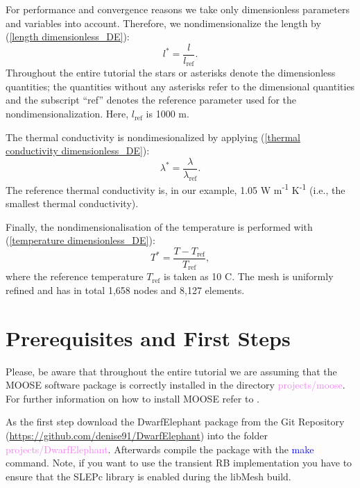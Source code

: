 \documentclass[11pt, a4paper, DIV=14]{scrartcl}
\begin{document}
For performance and convergence reasons we take only dimensionless parameters and variables into account. Therefore, we nondimensionalize the length by (\ref{length dimensionless_DE}):
% 
\begin{equation}
l^* = \frac{l}{l_{\textrm{ref}}}. 
\label{length dimensionless_DE}
\end{equation}
%
Throughout the entire tutorial the stars or asterisks denote the dimensionless quantities; the quantities without any asterisks refer to the dimensional quantities and the subscript ``ref'' denotes the reference parameter used for the nondimensionalization. Here,  $l_{\textrm{ref}}$ is 1000 m.

\noindent The thermal conductivity is nondimesionalized by applying (\ref{thermal conductivity dimensionless_DE}):
%
\begin{equation}
\lambda^* = \frac{\lambda}{\lambda_{\textrm{ref}}}.
\label{thermal conductivity dimensionless_DE}
\end{equation}
%
The reference thermal conductivity is, in our example, 1.05 W m\textsuperscript{-1} K\textsuperscript{-1} (i.e., the smallest thermal conductivity). 

Finally, the nondimensionalisation of the temperature is performed with (\ref{temperature dimensionless_DE}):
%
\begin{equation}
T^*=\frac{T-T_{\textrm{ref}}}{T_{\textrm{ref}}},
\label{temperature dimensionless_DE}
\end{equation}
% 
where the reference temperature $T_{\textrm{ref}}$ is taken as 10 \textdegree C. The mesh is uniformly refined and has in total 1,658 nodes and 8,127 elements.

\section{Prerequisites and First Steps}
Please, be aware that throughout the entire tutorial we are assuming that the MOOSE software package is correctly installed in the directory \textcolor{violet}{projects/moose}. For further information on how to install MOOSE refer to \cite{moose-web-page}.

 As the first step download the DwarfElephant package from the Git Repository (\url{https://github.com/denise91/DwarfElephant}) into the folder \textcolor{violet}{projects/DwarfElephant}. Afterwards compile the package with the \textcolor{blue}{make} command. Note, if you want to use the transient RB implementation you have to ensure that the SLEPc library \cite{slepc} is enabled during the libMesh build.
\end{document}
